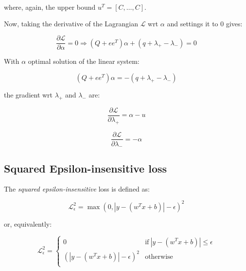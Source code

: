 where, again, the upper bound $u^T = [C, \dots, C]$.

Now, taking the derivative of the Lagrangian $\mathcal{L}$ wrt $\alpha$ and settings it to 0 gives:

\begin{equation} \label{eq:l1_svr_bcqp_lagrangian_der_a}
	\frac{\partial \mathcal{L}}{\partial \alpha}=0\Rightarrow (Q + ee^T) \alpha + (q + \lambda_+ - \lambda_-) = 0
\end{equation}

With $\alpha$ optimal solution of the linear system:

\begin{equation} \label{eq:l1_svr_bcqp_lagrangian_sol}
    (Q + ee^T) \alpha = - (q + \lambda_+ - \lambda_-)
\end{equation}

the gradient wrt $\lambda_+$ and $\lambda_-$ are:

\begin{equation} \label{eq:l1_svr_bcqp_lagrangian_der_lp}
	\frac{\partial \mathcal{L}}{\partial \lambda_+}=\alpha - u
\end{equation}

\begin{equation} \label{eq:l1_svr_bcqp_lagrangian_der_lm}
    \frac{\partial \mathcal{L}}{\partial \lambda_-}=-\alpha
\end{equation}

\pagebreak

\subsection{Squared Epsilon-insensitive loss}

The \emph{squared epsilon-insensitive} loss is defined as:

\begin{equation} \label{eq:squared_eps_loss1}
	\mathcal{L}_\epsilon^2 = \max(0, |y - (w^T x + b)| - \epsilon)^2
\end{equation}

or, equivalently:

\begin{equation} \label{eq:squared_eps_loss2}
	\mathcal{L}_\epsilon^2 = 
	\begin{cases}
		0 & \text{if} \ |y - (w^T x + b)| \leq \epsilon \\
		(|y - (w^T x + b)| - \epsilon)^2 & \text{otherwise} \\
	\end{cases}
\end{equation}

